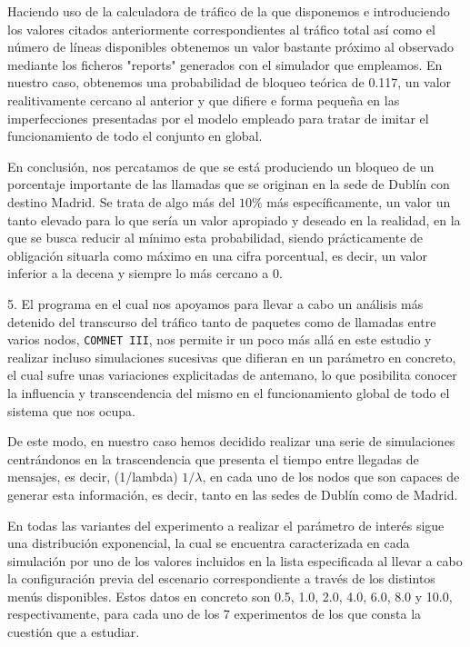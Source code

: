 Haciendo uso de la calculadora de tráfico de la que disponemos e introduciendo los valores citados anteriormente correspondientes al tráfico total así como el número de líneas disponibles obtenemos un valor bastante próximo al observado mediante los ficheros "reports" generados con el simulador que empleamos. En nuestro caso, obtenemos una probabilidad de bloqueo teórica de 0.117, un valor realitivamente cercano al anterior y que difiere e forma pequeña en las imperfecciones presentadas por el modelo empleado para tratar de imitar el funcionamiento de todo el conjunto en global.

En conclusión, nos percatamos de que se está produciendo un bloqueo de un porcentaje importante de las llamadas que se originan en la sede de Dublín con destino Madrid. Se trata de algo más del $10\%$ más específicamente, un valor un tanto elevado para lo que sería un valor apropiado y deseado en la realidad, en la que se busca reducir al mínimo esta probabilidad, siendo prácticamente de obligación situarla como máximo en una cifra porcentual, es decir, un valor inferior a la decena y siempre lo más cercano a 0.

5.
El programa en el cual nos apoyamos para llevar a cabo un análisis más detenido del transcurso del tráfico tanto de paquetes como de llamadas entre varios nodos, \texttt{COMNET III}, nos permite ir un poco más allá en este estudio y realizar incluso simulaciones sucesivas que difieran en un parámetro en concreto, el cual sufre unas variaciones explicitadas de antemano, lo que posibilita conocer la influencia y transcendencia del mismo en el funcionamiento global de todo el sistema que nos ocupa.

De este modo, en nuestro caso hemos decidido realizar una serie de simulaciones centrándonos en la trascendencia que presenta el tiempo entre llegadas de mensajes, es decir, (1/lambda) $1/\lambda$, en cada uno de los nodos que son capaces de generar esta información, es decir, tanto en las sedes de Dublín como de Madrid.

En todas las variantes del experimento a realizar el parámetro de interés sigue una distribución exponencial, la cual se encuentra caracterizada en cada simulación por uno de los valores incluidos en la lista especificada al llevar a cabo la configuración previa del escenario correspondiente a través de los distintos menús disponibles. Estos datos en concreto son 0.5, 1.0, 2.0, 4.0, 6.0, 8.0 y 10.0, respectivamente, para cada uno de los 7 experimentos de los que consta la cuestión que a estudiar.

